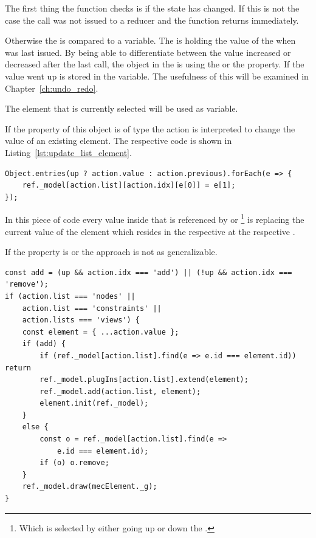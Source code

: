 The first thing the  function checks is if the  state has changed.
If this is not the case the  call was not issued to a  reducer and the function returns immediately.

Otherwise the  is compared to a  variable.
The  is holding the value of the  when  was last issued.
By being able to differentiate between the  value increased or decreased after the last call, the object in the  is using the  or the  property.
If the  value went up is stored in the  variable.
The usefulness of this will be examined in Chapter~\ref{ch:undo_redo}.

The  element that is currently selected will be used as  variable.

If the  property of this object is of type  the action is interpreted to change the value of an existing element.
The respective code is shown in Listing~\ref{lst:update_list_element}.

\begin{lstlisting}[label={lst:update_list_element}, caption={Updating an element in one of \code{mecElement} arrays.}]
Object.entries(up ? action.value : action.previous).forEach(e => {
    ref._model[action.list][action.idx][e[0]] = e[1];
});
\end{lstlisting}

In this piece of code every value inside  that is referenced by  or \footnote{Which is selected by either going up or down the .} is replacing the current value of the element which resides in the respective  at the respective .

If the  property is  or  the approach is not as generalizable.

\begin{lstlisting}[label={lst:add_remove_list_element}, caption={Adding or removing an element in \code{mecElement}.}]
const add = (up && action.idx === 'add') || (!up && action.idx === 'remove');
if (action.list === 'nodes' ||
    action.list === 'constraints' ||
    action.lists === 'views') {
    const element = { ...action.value };
    if (add) {
        if (ref._model[action.list].find(e => e.id === element.id)) return
        ref._model.plugIns[action.list].extend(element);
        ref._model.add(action.list, element);
        element.init(ref._model);
    }
    else {
        const o = ref._model[action.list].find(e =>
            e.id === element.id);
        if (o) o.remove;
    }
    ref._model.draw(mecElement._g);
}
\end{lstlisting}

